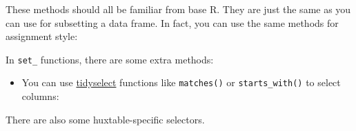 \documentclass[]{article}
\newenvironment{Shaded}{\begin{snugshade}}{\end{snugshade}}
\newcommand{\CommentTok}[1]{\textcolor[rgb]{0.56,0.35,0.01}{\textit{#1}}}
\newcommand{\DecValTok}[1]{\textcolor[rgb]{0.00,0.00,0.81}{#1}}
\newcommand{\KeywordTok}[1]{\textcolor[rgb]{0.13,0.29,0.53}{\textbf{#1}}}
\newcommand{\NormalTok}[1]{#1}
\newcommand{\OperatorTok}[1]{\textcolor[rgb]{0.81,0.36,0.00}{\textbf{#1}}}
\newcommand{\OtherTok}[1]{\textcolor[rgb]{0.56,0.35,0.01}{#1}}
\newcommand{\StringTok}[1]{\textcolor[rgb]{0.31,0.60,0.02}{#1}}
\begin{document}
These methods should all be familiar from base R. They are just the same
as you can use for subsetting a data frame. In fact, you can use the
same methods for assignment style:

\begin{Shaded}
\end{Shaded}

\FloatBarrier

In \texttt{set\_} functions, there are some extra methods:

\begin{itemize}
\item
  You can use
  \href{https://r4ds.had.co.nz/transform.html\#select}{tidyselect}
  functions like \texttt{matches()} or \texttt{starts\_with()} to select
  columns:

\begin{Shaded}
\end{Shaded}

  \FloatBarrier
\end{itemize}

There are also some huxtable-specific selectors.
\end{document}
